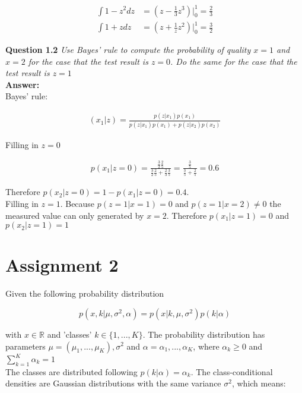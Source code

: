 \documentclass[a4paper]{article}
\begin{document}
\begin{align*}
\int 1 - z^2 dz &= (z - \frac{1}{3} z^3) \Big|_0^1 = \frac{2}{3}\\
\int 1 + zdz  &= (z + \frac{1}{z} z^2) \Big|_0^1 = \frac{3}{2}
\end{align*}

\textbf{Question 1.2}  \textit{Use Bayes' rule to compute the probability of quality $x = 1$ and $x = 2$ for the case that the test result is $z = 0$. Do the same for the case that the test result is $z = 1$}\\

\textbf{Answer:}\\

Bayes' rule:

\begin{align*}
(x_1 | z) = \frac{p(z | x_1)p(x_1)}{p(z | x_1)p(x_1) + p(z | x_2)p(x_2)}
\end{align*}

Filling in $z = 0$

\begin{align*}
	p(x_1 | z= 0) = \frac{ \frac{3}{2} \frac{2}{5}}{\frac{3}{2} \frac{2}{5} + \frac{2}{3} \frac{3}{5}} = \frac{ \frac{3}{5}}{\frac{3}{5} + \frac{2}{5}} = 0.6
\end{align*}


Therefore $p(x_2 | z = 0) = 1 - p(x_1 | z = 0) = 0.4$. \\
Filling in $z = 1$. Because $p(z = 1 | x = 1) = 0$ and $p(z = 1 | x = 2) \neq 0$ the measured value can only generated by $x = 2$. Therefore $p(x_1 | z = 1) = 0$ and $p(x_2 | z = 1) = 1$
\section*{Assignment 2}

Given the following probability distribution 

\begin{equation}
	p(x, k | \mu, \sigma^2, \alpha) = p(x | k, \mu, \sigma^2)p(k | \alpha)
\end{equation}

with $x \in \mathbb{R}$ and 'classes' $k \in \{ 1, ..., K\}$. The probability distribution has parameters $\mu = (\mu_1, ..., \mu_K), \sigma^2$ and $\alpha = \alpha_1, ..., \alpha_K$, where $\alpha_k \geq 0$ and $\sum_{k = 1}^K \alpha_k = 1$\\

The classes are distributed following $p(k | \alpha) = \alpha_k$. The class-conditional densities are Gaussian distributions with the same variance $\sigma^2$, which means:
\end{document}

